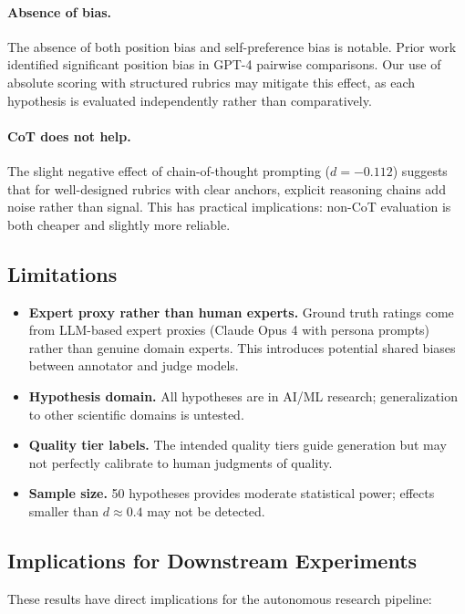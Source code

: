 \documentclass[11pt,a4paper]{article}
\begin{document}
\paragraph{Absence of bias.}  The absence of both position bias and
self-preference bias is notable.  Prior work~\citep{zheng2023judging}
identified significant position bias in GPT-4 pairwise comparisons.  Our
use of absolute scoring with structured rubrics may mitigate this effect,
as each hypothesis is evaluated independently rather than comparatively.

\paragraph{CoT does not help.}  The slight negative effect of
chain-of-thought prompting ($d = -0.112$) suggests that for well-designed
rubrics with clear anchors, explicit reasoning chains add noise rather
than signal.  This has practical implications: non-CoT evaluation is both
cheaper and slightly more reliable.

\subsection{Limitations}

\begin{itemize}
  \item \textbf{Expert proxy rather than human experts.}  Ground truth
    ratings come from LLM-based expert proxies (Claude Opus 4 with persona
    prompts) rather than genuine domain experts.  This introduces potential
    shared biases between annotator and judge models.
  \item \textbf{Hypothesis domain.}  All hypotheses are in AI/ML research;
    generalization to other scientific domains is untested.
  \item \textbf{Quality tier labels.}  The intended quality tiers guide
    generation but may not perfectly calibrate to human judgments of
    quality.
  \item \textbf{Sample size.}  50 hypotheses provides moderate statistical
    power; effects smaller than $d \approx 0.4$ may not be detected.
\end{itemize}

\subsection{Implications for Downstream Experiments}

These results have direct implications for the autonomous research pipeline:
\end{document}
